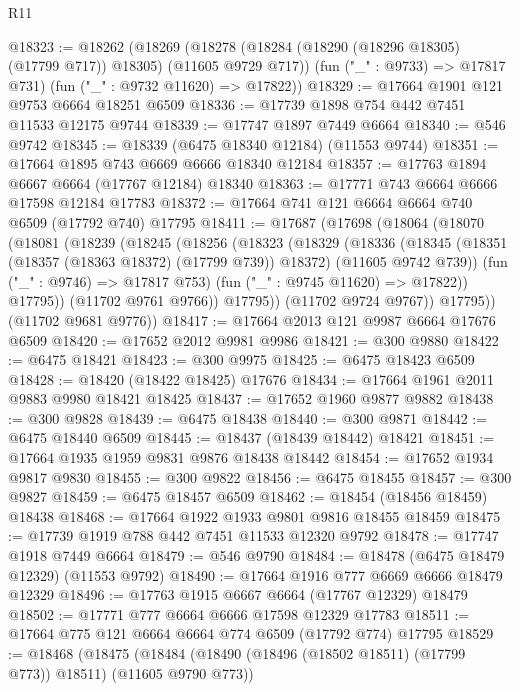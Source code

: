 \begin{lexlean}{R11}
\begin{coremodule}
{{{{{{{{{{{{{{{{{{{{{{{{{{{{{{{{{{{{{{{{{{{{{{{{{{{{{{{{{{{{{{{{{{{{{{{{{{{{{{{{{{@18323 := @18262
    (@18269
      (@18278 (@18284 (@18290 (@18296 @18305) (@17799 @717)) @18305) (@11605 @9729 @717))
      (fun ("_" : @9733) => @17817 @731)
      (fun ("_" : @9732 @11620) => @17822))
@18329 := @17664 @1901 @121 @9753 @6664 @18251 @6509
@18336 := @17739 @1898 @754 @442 @7451 @11533 @12175 @9744
@18339 := @17747 @1897 @7449 @6664
@18340 := @546 @9742
@18345 := @18339 (@6475 @18340 @12184) (@11553 @9744)
@18351 := @17664 @1895 @743 @6669 @6666 @18340 @12184
@18357 := @17763 @1894 @6667 @6664 (@17767 @12184) @18340
@18363 := @17771 @743 @6664 @6666 @17598 @12184 @17783
@18372 := @17664 @741 @121 @6664 @6664 @740 @6509 (@17792 @740) @17795
@18411 := @17687
    (@17698
      (@18064
        (@18070
          (@18081
            (@18239
              (@18245
                (@18256
                  (@18323
                    (@18329
                      (@18336
                        (@18345
                          (@18351 (@18357 (@18363 @18372) (@17799 @739)) @18372)
                          (@11605 @9742 @739))
                        (fun ("_" : @9746) => @17817 @753)
                        (fun ("_" : @9745 @11620) => @17822))
                      @17795))
                  (@11702 @9761 @9766))
                @17795))
            (@11702 @9724 @9767))
          @17795))
      (@11702 @9681 @9776))
@18417 := @17664 @2013 @121 @9987 @6664 @17676 @6509
@18420 := @17652 @2012 @9981 @9986
@18421 := @300 @9880
@18422 := @6475 @18421
@18423 := @300 @9975
@18425 := @6475 @18423 @6509
@18428 := @18420 (@18422 @18425) @17676
@18434 := @17664 @1961 @2011 @9883 @9980 @18421 @18425
@18437 := @17652 @1960 @9877 @9882
@18438 := @300 @9828
@18439 := @6475 @18438
@18440 := @300 @9871
@18442 := @6475 @18440 @6509
@18445 := @18437 (@18439 @18442) @18421
@18451 := @17664 @1935 @1959 @9831 @9876 @18438 @18442
@18454 := @17652 @1934 @9817 @9830
@18455 := @300 @9822
@18456 := @6475 @18455
@18457 := @300 @9827
@18459 := @6475 @18457 @6509
@18462 := @18454 (@18456 @18459) @18438
@18468 := @17664 @1922 @1933 @9801 @9816 @18455 @18459
@18475 := @17739 @1919 @788 @442 @7451 @11533 @12320 @9792
@18478 := @17747 @1918 @7449 @6664
@18479 := @546 @9790
@18484 := @18478 (@6475 @18479 @12329) (@11553 @9792)
@18490 := @17664 @1916 @777 @6669 @6666 @18479 @12329
@18496 := @17763 @1915 @6667 @6664 (@17767 @12329) @18479
@18502 := @17771 @777 @6664 @6666 @17598 @12329 @17783
@18511 := @17664 @775 @121 @6664 @6664 @774 @6509 (@17792 @774) @17795
@18529 := @18468
    (@18475
      (@18484 (@18490 (@18496 (@18502 @18511) (@17799 @773)) @18511) (@11605 @9790 @773))
}}}}}}}}}}}}}}}}}}}}}}}}}}}}}}}}}}}}}}}}}}}}}}}}}}}}}}}}}}}}}}}}}}}}}}}}}}}}}}}}}}
\end{coremodule}
\end{lexlean}
